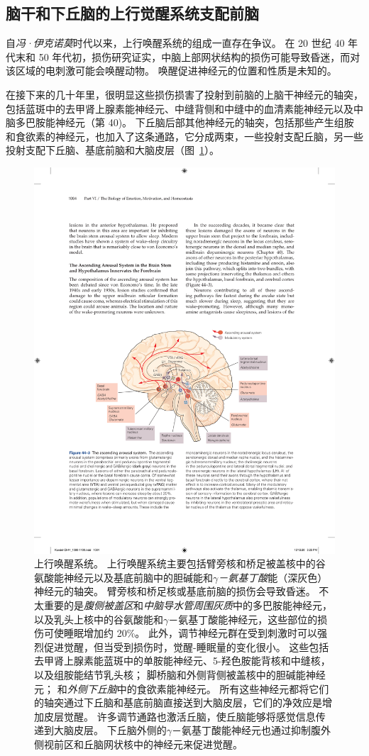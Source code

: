 \subsection{脑干和下丘脑的上行觉醒系统支配前脑}

自\textit{冯·伊克诺莫}时代以来，上行唤醒系统的组成一直存在争议。
在 20 世纪 40 年代末和 50 年代初，损伤研究证实，中脑上部网状结构的损伤可能导致昏迷，而对该区域的电刺激可能会唤醒动物。
唤醒促进神经元的位置和性质是未知的。


在接下来的几十年里，很明显这些损伤损害了投射到前脑的上脑干神经元的轴突，包括蓝斑中的去甲肾上腺素能神经元、中缝背侧和中缝中的血清素能神经元以及中脑多巴胺能神经元（第 40)。
下丘脑后部其他神经元的轴突，包括那些产生组胺和食欲素的神经元，也加入了这条通路，它分成两束，一些投射支配丘脑，另一些投射支配下丘脑、基底前脑和大脑皮层（图~\ref{fig:44_3}）。


\begin{figure}[htbp]
	\centering
	\includegraphics[width=0.75\linewidth]{chap44/fig_44_3}
	\caption{上行唤醒系统。
		上行唤醒系统主要包括臂旁核和桥足被盖核中的谷氨酸能神经元以及基底前脑中的胆碱能和\textit{$\gamma$－氨基丁酸}能（深灰色）神经元的轴突。
		臂旁核和桥足核或基底前脑的损伤会导致昏迷。
		不太重要的是\textit{腹侧被盖区}和\textit{中脑导水管周围灰质}中的多巴胺能神经元，以及乳头上核中的谷氨酸能和$\gamma$－氨基丁酸能神经元，这些部位的损伤可使睡眠增加约 20\%。
		此外，调节神经元群在受到刺激时可以强烈促进觉醒，但当受到损伤时，觉醒-睡眠量的变化很小。
		这些包括去甲肾上腺素能蓝斑中的单胺能神经元、5-羟色胺能背核和中缝核，以及组胺能结节乳头核；
		脚桥脑和外侧背侧被盖核中的胆碱能神经元；
		和\textit{外侧下丘脑}中的食欲素能神经元。
		所有这些神经元都将它们的轴突通过下丘脑和基底前脑直接送到大脑皮层，它们的净效应是增加皮层觉醒。
		许多调节通路也激活丘脑，使丘脑能够将感觉信息传递到大脑皮层。
		下丘脑外侧的$\gamma$－氨基丁酸能神经元也通过抑制腹外侧视前区和丘脑网状核中的神经元来促进觉醒。}
	\label{fig:44_3}
\end{figure}


